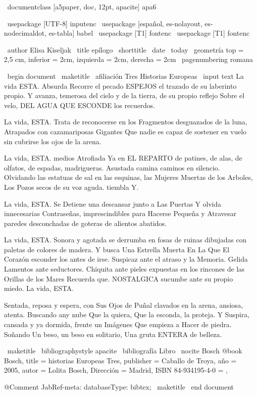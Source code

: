\ documentclass [a5paper, doc, 12pt, apacite] {} apa6

\ usepackage [UTF-8] {} inputenc
\ usepackage [español, es-nolayout, es-nodecimaldot, es-tabla] {babel}
\ usepackage [T1] {} fontenc
\ usepackage [T1] {} fontenc


\ author {Elisa Kiseljak}
\ title {} epílogo
\ shorttitle {}
\ date { \ today }
\ geometría {top = 2,5 cm, inferior = 2cm, izquierda = 2cm, derecha = 2cm}
\ pagenumbering {} romana


\ begin {document}
\ maketitle
\ afiliación {} Tres Historias Europeas
\ input {text}
La vida ESTA. Absurda Recorre el pecado ESPEJOS el trazado de su laberinto propio. Y avanza, temerosa del cielo y de la tierra, de su propio reflejo Sobre el velo, DEL AGUA QUE ESCONDE los recuerdos.

La vida, ESTA. Trata de reconocerse en los Fragmentos desguazados de la luna, Atrapados con cazamariposas Gigantes Que nadie es capaz de sostener en vuelo sin cubrirse los ojos de la arena.

La vida, ESTA. medios Atrofiada Ya en EL REPARTO de patines, de alas, de olfatos, de espadas, madrigueras. Asustada camina caminos en silencio. Olvidando las estatuas de sal en las esquinas, las Mujeres Muertas de los Arboles, Los Pozos secos de su voz aguda. tiembla Y.

La vida, ESTA. Se Detiene una descansar junto a Las Puertas Y olvida innecesarias Contraseñas, imprescindibles para Hacerse Pequeña y Atravesar paredes desconchadas de goteras de alientos abatidos.

La vida, ESTA. Sonora y agotada se derrumba en fosas de ruinas dibujadas con paletas de colores de madera. Y busca Una Estrella Muerta En La Que El Corazón esconder los antes de irse. Suspicaz ante el atraso y la Memoria. Gelida Lamentos ante seductores. Chiquita ante pieles expuestas en los rincones de las Orillas de los Mares Recuerda que. NOSTALGICA sucumbe ante su propio miedo. La vida, ESTA.

Sentada, reposa y espera, con Sus Ojos de Puñal clavados en la arena, ansiosa, atenta. Buscando any nube Que la quiera, Que la esconda, la proteja. Y Suspira, cansada y ya dormida, frente un Imágenes Que empieza a Hacer de piedra. Soñando Un beso, un beso en solitario, Una gruta ENTERA de belleza.


\ maketitle
\ bibliographystyle {} apacite
\ bibliografía {} Libro
\ nocite {} Bosch
@book {Bosch,
  title = {historias Europeas Tres},
  publisher = {} Caballo de Troya,
  año = {2005},
  autor = {} Lolita Bosch,
  Dirección = {} Madrid,
  ISBN 84-934195-4-0 = {},
}

@Comment {JabRef-meta: databaseType: bibtex;}
\ maketitle
\ end {document}